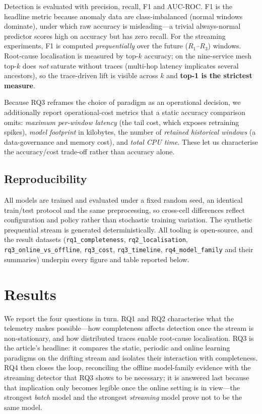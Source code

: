 \documentclass[pdflatex,sn-mathphys-num]{sn-jnl}%
\theoremstyle{thmstyleone}%
\theoremstyle{thmstyletwo}%
\theoremstyle{thmstylethree}%
\begin{document}
Detection is evaluated with precision, recall, F1 and AUC-ROC. F1 is the headline metric because anomaly data are class-imbalanced (normal windows dominate), under which raw accuracy is misleading---a trivial always-normal predictor scores high on accuracy but has zero recall. For the streaming experiments, F1 is computed \emph{prequentially} over the future ($R_1$--$R_3$) windows. Root-cause localisation is measured by top-$k$ accuracy; on the nine-service mesh top-$k$ does \emph{not} saturate without traces (multi-hop latency implicates several ancestors), so the trace-driven lift is visible across $k$ and \textbf{top-1 is the strictest measure}.

Because RQ3 reframes the choice of paradigm as an operational decision, we additionally report operational-cost metrics that a static accuracy comparison omits: \emph{maximum per-window latency} (the tail cost, which exposes retraining spikes), \emph{model footprint} in kilobytes, the number of \emph{retained historical windows} (a data-governance and memory cost), and \emph{total CPU time}. These let us characterise the accuracy/cost trade-off rather than accuracy alone.

\subsection{Reproducibility}\label{sec:method-repro}

All models are trained and evaluated under a fixed random seed, an identical train/test protocol and the same preprocessing, so cross-cell differences reflect configuration and policy rather than stochastic training variation. The synthetic prequential stream is generated deterministically. All tooling is open-source, and the result datasets (\texttt{rq1\_completeness}, \texttt{rq2\_localisation}, \texttt{rq3\_online\_vs\_offline}, \texttt{rq3\_cost}, \texttt{rq3\_timeline}, \texttt{rq4\_model\_family} and their summaries) underpin every figure and table reported below.

\section{Results}\label{sec:results}

We report the four questions in turn. RQ1 and RQ2 characterise what the telemetry makes possible---how completeness affects detection once the stream is non-stationary, and how distributed traces enable root-cause localisation. RQ3 is the article's headline: it compares the static, periodic and online learning paradigms on the drifting stream and isolates their interaction with completeness. RQ4 then closes the loop, reconciling the offline model-family evidence with the streaming detector that RQ3 shows to be necessary; it is answered last because that implication only becomes legible once the online setting is in view---the strongest \emph{batch} model and the strongest \emph{streaming} model prove not to be the same model.
\end{document}
